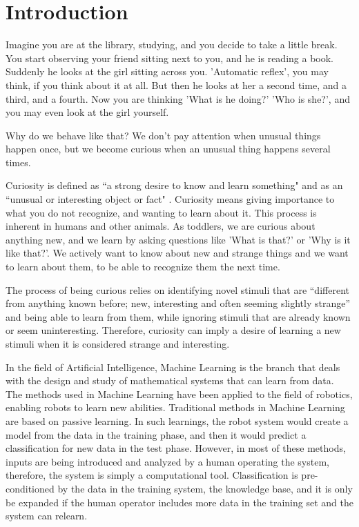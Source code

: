 
\chapter{Introduction} %

\label{Chapter1} %



Imagine you are at the library, studying, and you decide to take a little break. You start observing your friend sitting next to you, and he is reading a book. Suddenly he looks at the girl sitting across you. 'Automatic reflex', you may think, if you think about it at all. But then he looks at her a second time, and a third, and a fourth. Now you are thinking 'What is he doing?' 'Who is she?', and you may even look at the girl yourself.  

Why do we behave like that?  We don't pay attention when unusual things happen once, but we become curious when an unusual thing happens several times.

\label{curiosity}
Curiosity is defined as “a strong desire to know and learn something" and as an “unusual or interesting object or fact" \cite{oxford}. Curiosity means giving importance to what you do not recognize, and wanting to learn about it. This process is inherent in humans and other animals. As toddlers, we are curious about anything new, and we learn by asking questions like 'What is that?' or 'Why is it like that?'. We actively want to know about new and strange things and we want to learn about them, to be able to recognize them the next time.

The process of being curious relies on identifying novel stimuli that are “different from anything known before; new, interesting and often seeming slightly strange” \label{novel} \cite{Pimentel2014} and being able to learn from them, while ignoring stimuli that are already known or seem uninteresting. Therefore, curiosity can imply a desire of learning a new stimuli when it is considered strange and interesting.

In the field of Artificial Intelligence, Machine Learning is the branch that deals with the design and study of mathematical systems that can learn from data. The methods used in Machine Learning have been applied to the field of robotics, enabling robots to learn new abilities. Traditional methods in Machine Learning are based on passive learning. In such learnings, the robot system would create a model from the data in the training phase, and then it would predict a classification for new data in the test phase. However, in most of these methods, inputs are being introduced and analyzed by a human operating the system, therefore, the system is simply a computational tool. Classification is pre-conditioned by the data in the training system, the knowledge base, and it is only be expanded if the human operator includes more data in the training set and the system can relearn. 

